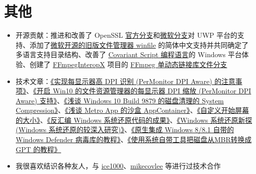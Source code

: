 \documentclass{resume}
\begin{document}
\section{其他}
\begin{itemize}

  \item 开源贡献：推进和改善了 OpenSSL \href{https://github.com/openssl/openssl/pulls?q=is:pr+author:MouriNaruto+}{官方分支}和\href{https://github.com/microsoft/openssl/pulls?q=is:pr+author:MouriNaruto+}{微软分支}对 UWP 平台的支持、添加了\href{https://github.com/microsoft/winfile/pulls?q=is:pr+author:MouriNaruto+}{微软开源的旧版文件管理器 winfile} 的简体中文支持并共同确定了多语言支持目录结构、改善了 \href{https://github.com/covscript/covscript/pulls?q=is:pr+author:MouriNaruto+}{Covariant Script 编程语言}的 Windows 平台体验、创建了 \href{https://github.com/ffmpeginteropx/FFmpegInteropX/pulls?q=is:pr+author:MouriNaruto+}{FFmpegInteropX} 项目的 \href{https://github.com/ffmpeginteropx/FFmpegInteropX/tree/FFmpegUniversal}{FFmpeg 单动态链接库文件分支}
  
  \item 技术文章：\href{https://www.52pojie.cn/thread-512713-1-1.html}{《实现每显示器高 DPI 识别 (Per\-Monitor DPI Aware) 的注意事项》}、\href{https://www.52pojie.cn/thread-506556-1-1.html}{《开启 Win10 的文件资源管理器的每显示器 DPI 缩放 (Per\-Monitor DPI Aware) 支持》}、\href{http://bbs.pcbeta.com/viewthread-1567726-1-1.html}{《浅谈 Windows 10 Build 9879 的磁盘清理的 System Compression》}、\href{http://bbs.pcbeta.com/viewthread-1611980-1-1.html}{《浅谈 Metro App 的沙盒 AppContainer》}、\href{http://bbs.pcbeta.com/viewthread-1524688-1-1.html}{《自定义开始屏幕的大小》}、\href{http://bbs.pcbeta.com/viewthread-1535789-1-1.html}{《反汇编 Windows 系统还原代码的成果》}、\href{http://bbs.pcbeta.com/viewthread-1507617-1-1.html}{《Windows 系统还原新探 (Windows 系统还原的较深入研究)》}、\href{http://bbs.pcbeta.com/viewthread-1519551-1-1.html}{《原生集成 Windows 8/8.1 自带的 Windows Defender 病毒库的教程》}、\href{http://bbs.pcbeta.com/viewthread-1488892-1-1.html}{《使用系统自带工具把磁盘从MBR转换成 GPT 的教程》}
  
  \item 我很喜欢结识各种友人，与 \href{https://github.com/ice1000/}{ice1000}、\href{https://github.com/mikecovlee}{mikecovlee} 等进行过技术合作

\end{itemize}
\end{document}
